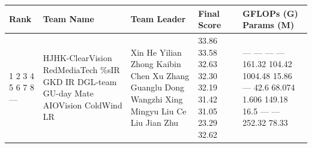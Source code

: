 \begin{tabular}{lllll}
\toprule
Rank & Team Name & Team Leader & Final Score & GFLOPs (G) Params (M) \\
\midrule
1 2 3 4 5 6 7 8 — & HJHK-ClearVision RedMediaTech \%sIR GKD IR DGL-team GU-day Mate AIOVision ColdWind LR & Xin He Yilian Zhong Kaibin Chen Xu Zhang Guanglu Dong Wangzhi Xing Mingyu Liu Ce Liu Jian Zhu & 33.86 33.58 32.63 32.30 32.19 31.42 31.05 23.29 32.62 & — — — — 161.32 104.42 1004.48 15.86 — 42.6 68.074 1.606 149.18 16.5 — — 252.32 78.33 \\
\bottomrule
\end{tabular}
